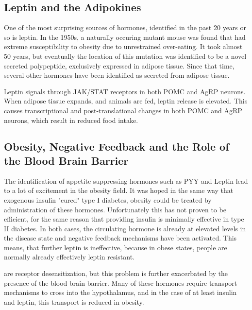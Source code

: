 \documentclass{tufte-handout}
\begin{document}
\subsection{Leptin and the Adipokines}

One of the most surprising sources of hormones, identified in the past 20 years or so is leptin.  In the 1950s, a naturally occuring mutant mouse was found that had extreme susceptibility to obesity due to unrestrained over-eating\cite{Ingalls1950}.  It took almost 50 years, but eventually the location of this mutation was identified to be a novel secreted polypeptide, exclusively expressed in adipose tissue\cite{Zhang1994}.  Since that time, several other hormones have been identified as secreted from adipose tissue.

  Leptin signals through JAK/STAT receptors in both POMC and AgRP neurons.  When adipose tissue expands, and animals are fed, leptin release is elevated.  This causes transcriptional and post-translational changes in both POMC and AgRP neurons, which result in reduced food intake.

\subsection{Obesity, Negative Feedback and the Role of the Blood Brain Barrier}

The identification of appetite suppressing hormones such as PYY and Leptin lead to a lot of excitement in the obesity field.  It was hoped in the same way that exogenous insulin "cured" type I diabetes, obesity could be treated by administration of these hormones.  Unfortunately this has not proven to be efficient, for the same reason that providing insulin is minimally effective in type II diabetes.  In both cases, the circulating hormone is already at elevated levels in the disease state and negative feedback mechanisms have been activated.  This means, that further leptin is ineffective, because in obese states, people are normally already effectively leptin resistant.

 are receptor desensitization, but this problem is further exacerbated by the presence of the blood-brain barrier.  Many of these hormones require transport mechanisms to cross into the hypothalamus, and in the case of at least insulin and leptin, this transport is reduced in obesity.
\end{document}
